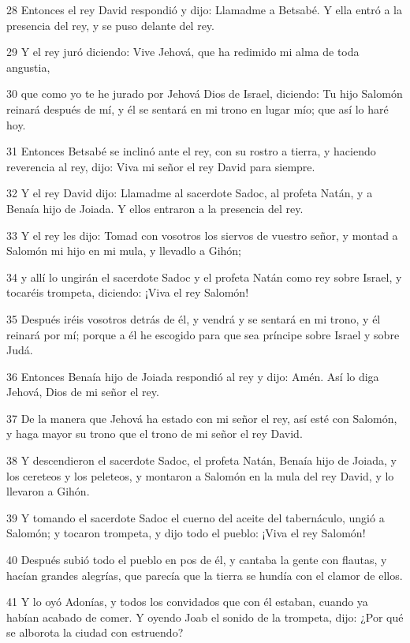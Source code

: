 \par 28 Entonces el rey David respondió y dijo: Llamadme a Betsabé. Y ella entró a la presencia del rey, y se puso delante del rey.
\par 29 Y el rey juró diciendo: Vive Jehová, que ha redimido mi alma de toda angustia,
\par 30 que como yo te he jurado por Jehová Dios de Israel, diciendo: Tu hijo Salomón reinará después de mí, y él se sentará en mi trono en lugar mío; que así lo haré hoy.
\par 31 Entonces Betsabé se inclinó ante el rey, con su rostro a tierra, y haciendo reverencia al rey, dijo: Viva mi señor el rey David para siempre.
\par 32 Y el rey David dijo: Llamadme al sacerdote Sadoc, al profeta Natán, y a Benaía hijo de Joiada. Y ellos entraron a la presencia del rey.
\par 33 Y el rey les dijo: Tomad con vosotros los siervos de vuestro señor, y montad a Salomón mi hijo en mi mula, y llevadlo a Gihón;
\par 34 y allí lo ungirán el sacerdote Sadoc y el profeta Natán como rey sobre Israel, y tocaréis trompeta, diciendo: ¡Viva el rey Salomón!
\par 35 Después iréis vosotros detrás de él, y vendrá y se sentará en mi trono, y él reinará por mí; porque a él he escogido para que sea príncipe sobre Israel y sobre Judá.
\par 36 Entonces Benaía hijo de Joiada respondió al rey y dijo: Amén. Así lo diga Jehová, Dios de mi señor el rey.
\par 37 De la manera que Jehová ha estado con mi señor el rey, así esté con Salomón, y haga mayor su trono que el trono de mi señor el rey David.
\par 38 Y descendieron el sacerdote Sadoc, el profeta Natán, Benaía hijo de Joiada, y los cereteos y los peleteos, y montaron a Salomón en la mula del rey David, y lo llevaron a Gihón.
\par 39 Y tomando el sacerdote Sadoc el cuerno del aceite del tabernáculo, ungió a Salomón; y tocaron trompeta, y dijo todo el pueblo: ¡Viva el rey Salomón!
\par 40 Después subió todo el pueblo en pos de él, y cantaba la gente con flautas, y hacían grandes alegrías, que parecía que la tierra se hundía con el clamor de ellos.
\par 41 Y lo oyó Adonías, y todos los convidados que con él estaban, cuando ya habían acabado de comer. Y oyendo Joab el sonido de la trompeta, dijo: ¿Por qué se alborota la ciudad con estruendo?
